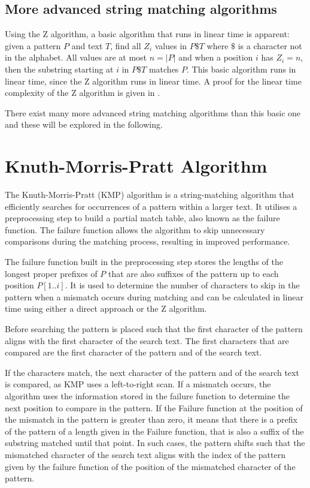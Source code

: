 \subsection{More advanced string matching algorithms}

Using the Z algorithm, a basic algorithm that runs in linear time is apparent: given a pattern $P$ and text $T$, find all $Z_i$ values in $P\$T$ where $\$$ is a character not in the alphabet. All values are at most $n=|P|$ and when a position $i$ has $Z_i=n$, then the substring starting at $i$ in $P\$T$ matches $P$. This basic algorithm runs in linear time, since the Z algorithm runs in linear time. A proof for the linear time complexity of the Z algorithm is given in \cite{Gusfield1997AlgorithmsOS}. 

There exist many more advanced string matching algorithms than this basic one and these will be explored in the following. 

\section{Knuth-Morris-Pratt Algorithm}
The Knuth-Morris-Pratt (KMP) algorithm is a string-matching algorithm that efficiently searches for occurrences of a pattern within a larger text. It utilises a preprocessing step to build a partial match table, also known as the failure function. The failure function allows the algorithm to skip unnecessary comparisons during the matching process, resulting in improved performance.

The failure function built in the preprocessing step stores the lengths of the longest proper prefixes of $P$ that are also suffixes of the pattern up to each position $P[1..i]$. It is used to determine the number of characters to skip in the pattern when a mismatch occurs during matching and can be calculated in linear time using either a direct approach or the Z algorithm. 

Before searching the pattern is placed such that the first character of the pattern aligns with the first character of the search text. The first characters that are compared are the first character of the pattern and of the search text. 

If the characters match, the next character of the pattern and of the search text is compared, as KMP uses a left-to-right scan. 
If a mismatch occurs, the algorithm uses the information stored in the failure function to determine the next position to compare in the pattern. If the Failure function at the position of the mismatch in the pattern is greater than zero, it means that there is a prefix of the pattern of a length given in the Failure function, that is also a suffix of the substring matched until that point. In such cases, the pattern shifts such that the mismatched character of the search text aligns with the index of the pattern given by the failure function of the position of the mismatched character of the pattern.

